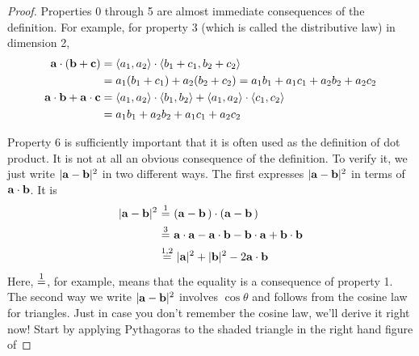 \begin{proof}
Properties 0 through 5 are almost immediate consequences of the definition.
For example, for property 3 (which is called the distributive law)
in dimension 2,
\begin{align*}
\mathbf{a}\cdot(\mathbf{b}+\mathbf{c})
    &=\left< a_1,a_2\right> \cdot\left< b_1+c_1,b_2+c_2\right> \\
    &=a_1(b_1+c_1)+a_2(b_2+c_2)=a_1b_1+a_1c_1+a_2b_2+a_2c_2\\
\mathbf{a}\cdot\mathbf{b}+\mathbf{a}\cdot\mathbf{c}
&=\left< a_1,a_2\right> \cdot\left< b_1,b_2\right> 
             +\left< a_1,a_2\right> \cdot\left< c_1,c_2\right> \\
&=a_1b_1+a_2b_2+a_1c_1+a_2c_2
\end{align*}


Property 6 is sufficiently important that it is often used as the 
definition of dot product. It is not at all an obvious consequence of the definition.
To verify it, we just write $|\mathbf{a}-\mathbf{b}|^2$ in two different ways. 
The first expresses $|\mathbf{a}-\mathbf{b}|^2$ in terms of $\mathbf{a}\cdot\mathbf{b}$. 
It is
\begin{align*}
|\va-\vb|^2\ &{\buildrel 1 \over =}\ (\va-\vb\,)\cdot(\va-\vb\,)\\
&{\buildrel 3 \over =}\ \va\cdot\va-\va\cdot\vb-\vb\cdot\va
+\vb\cdot\vb\\
&{\buildrel 1,2 \over =}\ |\va|^2+|\vb|^2-2\va\cdot\vb
\end{align*}
Here, ${\buildrel 1 \over =}$, for
example, means that the equality is  a consequence of property 1.
The second way we write $|\mathbf{a}-\mathbf{b}|^2$ involves $\cos\theta$ and follows from
the cosine law for triangles. Just in case you don't remember the 
cosine law, we'll derive it right now! Start by applying Pythagoras to the 
shaded triangle in the right hand figure of


\end{proof}
